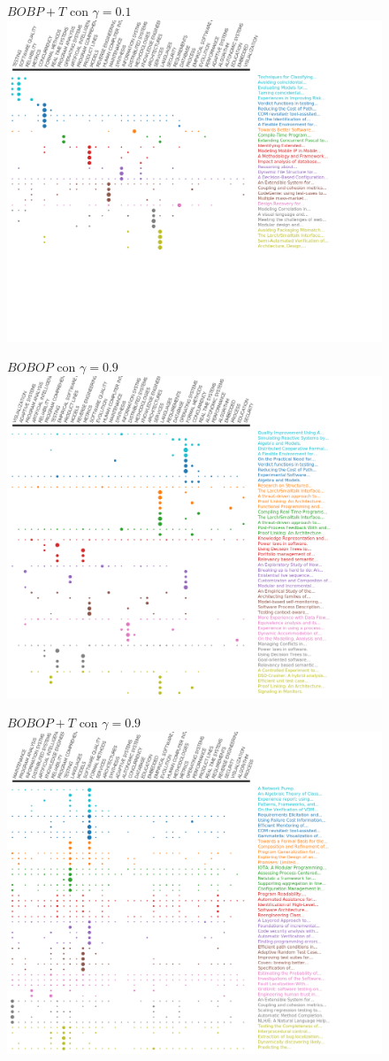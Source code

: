 \begin{figure}[H]
	\centering
	$BOBP+T$ con $\gamma=0.1$ \\
	\includegraphics[width=0.80\linewidth]{img/gamma-01-alg-4.png}
	\caption{}
	\label{res:gamma01-alg-4}
\end{figure}

\begin{figure}[H]
	\centering
	$BOBOP$ con $\gamma=0.9$ \\
	\includegraphics[width=0.80\linewidth]{img/gamma-09-alg-3.png}
	\caption{}
	\label{res:gamma09-alg-1}
\end{figure}

\begin{figure}[H]
	\centering
	$BOBOP+T$ con $\gamma=0.9$ \\
	\includegraphics[width=0.80\linewidth]{img/gamma-09-alg-4.png}
	\caption{}
	\label{res:gamma09-alg-4}
\end{figure}